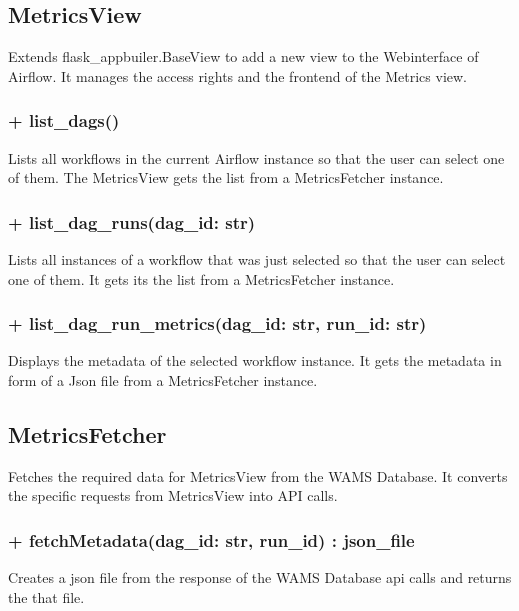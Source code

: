 \subsection{MetricsView}
Extends flask\_appbuiler.BaseView to add a new view to the Webinterface of Airflow. It manages the
access rights and the frontend of the Metrics view.

\subsubsection{+ list\_dags()}
Lists all workflows in the current Airflow instance so that the user can select one of them.
The MetricsView gets the list from a MetricsFetcher instance.
\subsubsection{+ list\_dag\_runs(dag\_id: str)}
Lists all instances of a workflow that was just selected so that the user can select one of them.
It gets its the list from a MetricsFetcher instance.
\subsubsection{+ list\_dag\_run\_metrics(dag\_id: str, run\_id: str)}
Displays the metadata of the selected workflow instance.
It gets the metadata in form of a Json file from a MetricsFetcher instance.

\subsection{MetricsFetcher}
Fetches the required data for MetricsView from the WAMS Database. It converts the specific 
requests from MetricsView into API calls.

\subsubsection{+ fetchMetadata(dag\_id: str, run\_id) : json\_file}
Creates a json file from the response of the WAMS Database api calls and returns the that file.

%


